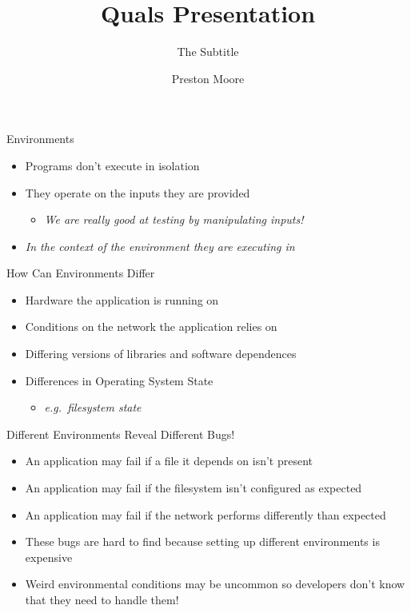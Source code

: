 \documentclass[pdf]{beamer}
\title{Quals Presentation}
\subtitle{The Subtitle}
\author{Preston Moore}
\begin{document}
\begin{frame}
  \titlepage{}
\end{frame}


\begin{frame}{Environments}
  \begin{itemize}
  \item{Programs don't execute in isolation}
  \item{They operate on the inputs they are provided}
    \begin{itemize}
    \item{\textit{We are really good at testing by manipulating inputs!}}
    \end{itemize}
  \item{\textit{In the context of the environment they are executing in}}
  \end{itemize}
\end{frame}


\begin{frame}{How Can Environments Differ}
  \begin{itemize}
  \item{Hardware the application is running on}
  \item{Conditions on the network the application relies on}
  \item{Differing versions of libraries and software dependences}
  \item{Differences in Operating System State}
    \begin{itemize}
    \item{\textit{e.g.\ filesystem state}}
    \end{itemize}
  \end{itemize}
\end{frame}


\begin{frame}{Different Environments Reveal Different Bugs!}
  \begin{itemize}
  \item{An application may fail if a file it depends on isn't present}
  \item{An application may fail if the filesystem isn't configured as
      expected}
  \item{An application may fail if the network performs differently than expected}
  \item{These bugs are hard to find because setting up different environments is
      expensive}
  \item{Weird environmental conditions may be uncommon so developers don't
      know that they need to handle them!}
  \end{itemize}
\end{frame}
\end{document}
